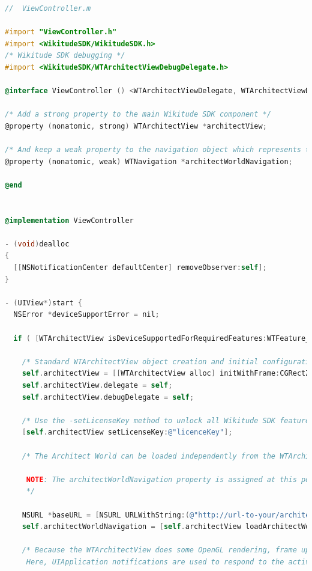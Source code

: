 \documentclass[thesis=M,english]{FITthesis}[2012/10/20]
\begin{document}
\begin{lstlisting}[language=C]
//  ViewController.m

#import "ViewController.h"
#import <WikitudeSDK/WikitudeSDK.h>
/* Wikitude SDK debugging */
#import <WikitudeSDK/WTArchitectViewDebugDelegate.h>

@interface ViewController () <WTArchitectViewDelegate, WTArchitectViewDebugDelegate>

/* Add a strong property to the main Wikitude SDK component */
@property (nonatomic, strong) WTArchitectView *architectView;

/* And keep a weak property to the navigation object which represents the loading status of your Architect World */
@property (nonatomic, weak) WTNavigation *architectWorldNavigation;

@end


@implementation ViewController

- (void)dealloc
{
  [[NSNotificationCenter defaultCenter] removeObserver:self];
}

- (UIView*)start {
  NSError *deviceSupportError = nil;

  if ( [WTArchitectView isDeviceSupportedForRequiredFeatures:WTFeature_Geo error:&deviceSupportError] ) {
    
    /* Standard WTArchitectView object creation and initial configuration */
    self.architectView = [[WTArchitectView alloc] initWithFrame:CGRectZero motionManager:nil];
    self.architectView.delegate = self;
    self.architectView.debugDelegate = self;
    
    /* Use the -setLicenseKey method to unlock all Wikitude SDK features that you bought with your license. */
    [self.architectView setLicenseKey:@"licenceKey"];
    
    /* The Architect World can be loaded independently from the WTArchitectView rendering.
     
     NOTE: The architectWorldNavigation property is assigned at this point. The navigation object is valid until another Architect World is loaded.
     */
    
    NSURL *baseURL = [NSURL URLWithString:(@"http://url-to-your/architect-world/index.html")];
    self.architectWorldNavigation = [self.architectView loadArchitectWorldFromURL:baseURL withRequiredFeatures:WTFeature_Geo];
    
    /* Because the WTArchitectView does some OpenGL rendering, frame updates have to be suspended and resumend when the application changes it's active state.
     Here, UIApplication notifications are used to respond to the active state changes.
     

\end{lstlisting}
\end{document}
